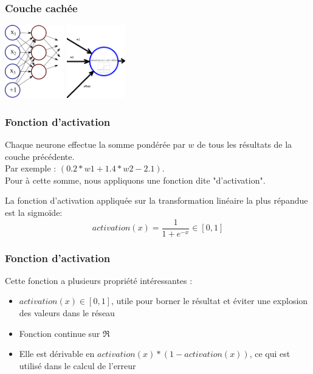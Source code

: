 \documentclass[compress]{beamer}
\begin{document}
			\begin{frame}
				\frametitle{Couche cachée}
				\hspace{6em}%
				\vspace{6em}
				\includegraphics[height=120px]{img/hidden_layer}\hspace{2em}%
				\includegraphics[height=120px]{img/neurone}
				\vspace{-4em}				
			\end{frame}
			
			\begin{frame}
				\frametitle{Fonction d'activation}
				
				Chaque neurone effectue la somme pondérée par $w$ de tous les résultats de la couche précédente.\\
				Par exemple : $(0.2*w1 + 1.4*w2 - 2.1)$.\\
				Pour à cette somme, nous appliquons une fonction dite "d'activation".
				
				La fonction d'activation appliquée sur la transformation linéaire la plus répandue est la sigmoïde: 
				$$  activation(x) = \frac{1}{1 + e^{-x}} \in \left[0, 1\right] $$				
			\end{frame}

			\begin{frame}
				\frametitle{Fonction d'activation}
				
				Cette fonction a plusieurs propriété intéressantes :
				\begin{itemize}
					\item $activation(x) \in [0, 1]$, utile pour borner le résultat et éviter une explosion des valeurs dans le réseau
					\item Fonction continue sur $\Re$
					\item Elle est dérivable en $activation(x) * (1 - activation(x))$, ce qui est utilisé dans le calcul de l'erreur
				\end{itemize}
			\end{frame}
\end{document}
